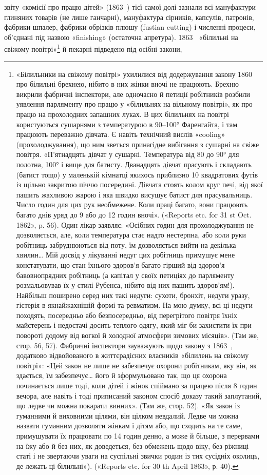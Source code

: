 \parcont{}  %
звіту «комісії про працю дітей» (1863~) тієї самої долі зазнали
всі мануфактури глиняних товарів (не лише ганчарні), мануфактура
сірників, капсулів, патронів, фабрики шпалер, фабрики
обрізків плюшу (fustian cutting) і численні процеси, об’єднані
під назвою «finishing» (остаточна апретура). 1863~ «білильні
на свіжому повітрі»\footnote{
«Білильники на свіжому повітрі» ухилилися від додержування
закону 1860~ про білильні брехнею, нібито в них жінки вночі не працюють.
Брехню викрили фабричні інспектори, але одночасно й петиції
робітників розбили уявлення парляменту про працю у «білильнях на
вільному повітрі», як про працю на прохолодних запашних луках. В цих
білильнях на повітрі користуються сушарнями з температурою в 90--100°
Фаренгайта, і там працюють переважно дівчата. Є навіть технічний вислів
«cooling» (прохолоджування), що ним зветься принагідне вибігання з
сушарні на свіже повітря. «П’ятнадцять дівчат у сушарні. Температура
від 80 до 90° для полотна, 100° і вище для батисту. Дванадцять дівчат прасують
і складають (батист тощо) у маленькій кімнатці якихось приблизно
10 квадратових футів із щільно закритою піччю посередині. Дівчата стоять
колом круг печі, від якої пашить жахливою жарою і яка швидко висушує
батист для прасувальниць. Число годин для цих рук необмежене. Коли
праці багато, вони працюють багато днів уряд до 9 або до 12 годин вночі».
(«Reports etc. for 31 st Oct. 1862», p. 56). Один лікар заявляє: «Осібних
годин для прохолоджування не дозволяється, але, коли температура стає
надто нестерпна, або коли руки робітниць забруднюються від поту, їм
дозволяється вийти на декілька хвилин\dots{} Мій досвід у лікуванні недуг
цих робітниць примушує мене констатувати, що стан їхнього здоров'я
багато гірший від здоров’я бавовнопрядних робітниць (а капітал у своїх
петиціях до парляменту розмальовував їх у стилі Рубенса, нібито від них
пашить здоров’ям!). Найбільш поширено серед них такі недуги: сухоти,
бронхіт, недуги уразу, гістерія в якнайжахнішій формі та ревматизм.
На мою думку, всі ці недуги походять, посередньо або безпосередньо,
від перегрітого повітря їхніх майстерень і недостачі досить теплого одягу,
який міг би захистити їх при повороті додому від вогкої й холодної атмосфери
зимових місяців». (Там же, стор. 56, 57). Фабричні інспектори зауважують
щодо закону з 1863~, додатково відвойованого в життєрадісних
власників «білилень на свіжому повітрі»: «Цей закон не лише не забезпечує
охорони робітникам, яку він, як здається, їм забезпечує\dots{} його й
зформульовано так, що ця охорона починається лише тоді, коли дітей
і жінок спіймано за працею після 8 годин вечора, але навіть і тоді приписаний
законом спосіб доказу такий заплутаний, що ледве чи можна
покарати винних». (Там же, стор. 52). «Як закон із гуманними й виховними
цілями, він цілком невдалий. Ледве чи можна назвати гуманним
дозволяти жінкам і дітям або, що сходить на те саме, примушувати їх
працювати по 14 годин денно, а може й більше, з перервами на їжу або
й без них, як доведеться, без обмежень щодо віку, без ріжниці статі
і не звертаючи уваги на суспільні звички родин із тих сусідніх околиць,
де лежать ці білильні»). («Reports etc. for 30 th April 1863», р. 40).
} й пекарні підведено під осібні закони,
